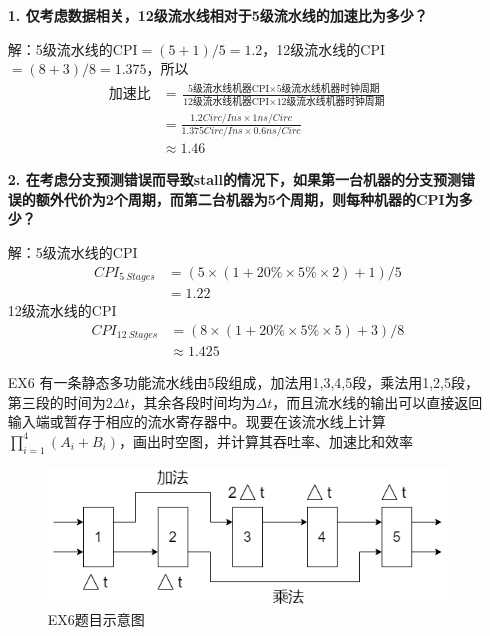 \documentclass[12pt,a4paper,utf8]{ctexart}
\begin{document}
\begin{enumerate}
\textbf{1. 仅考虑数据相关，12级流水线相对于5级流水线的加速比为多少？}

解：5级流水线的CPI$ = (5+1) / 5  = 1.2$，12级流水线的CPI$ = (8+3) / 8 = 1.375$，所以
\begin{equation}
	\begin{aligned}
		\mbox{加速比} &= \frac{\mbox{5级流水线机器CPI} \times \mbox{5级流水线机器时钟周期}}{\mbox{12级流水线机器CPI} \times  \mbox{12级流水线机器时钟周期}} \\
		&= \frac{1.2 Circ/Ins \times 1ns/Circ}{1.375 Circ/Ins \times 0.6ns/Circ} \\
		&\approx 1.46
	\end{aligned}\nonumber
\end{equation}

\textbf{2. 在考虑分支预测错误而导致stall的情况下，如果第一台机器的分支预测错误的额外代价为2个周期，而第二台机器为5个周期，则每种机器的CPI为多少？}

解：5级流水线的CPI
\begin{equation}
	\begin{aligned}
		CPI_{5\ Stages} &= (5\times (1+20\% \times 5\% \times 2) + 1) / 5 \\
		&= 1.22
	\end{aligned}\nonumber
\end{equation}
12级流水线的CPI
\begin{equation}
	\begin{aligned}
		CPI_{12\ Stages} &= (8\times (1+20\% \times 5\% \times 5 ) + 3) / 8 \\
		&\approx 1.425
	\end{aligned}\nonumber
\end{equation}

\item[EX6] %
有一条静态多功能流水线由5段组成，加法用1,3,4,5段，乘法用1,2,5段，第三段的时间为$ 2\Delta t $，其余各段时间均为$ \Delta t $，而且流水线的输出可以直接返回输入端或暂存于相应的流水寄存器中。现要在该流水线上计算$ \prod_{i = 1}^{4} (A_i + B_i)$，画出时空图，并计算其吞吐率、加速比和效率
\begin{figure}[htbp]
	\centering
	\includegraphics[width=0.7\linewidth]{EX6T}
	\caption{EX6题目示意图}
	\label{fig:ex6t}
\end{figure}



\end{enumerate}
\end{document}

